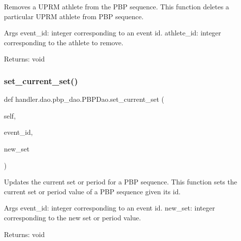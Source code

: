 \begin{DoxyVerb}Removes a UPRM athlete from the PBP sequence.
This function deletes a particular UPRM athlete from PBP sequence.

Args
    event_id: integer corresponding to an event id.
    athlete_id: integer corresponding to the athlete to remove.

Returns:
    void
\end{DoxyVerb}
 \mbox{\label{classhandler_1_1dao_1_1pbp__dao_1_1_p_b_p_dao_a4f1b438b7950a4faa505749891b52be3}} 
\subsubsection{\texorpdfstring{set\+\_\+current\+\_\+set()}{set\_current\_set()}}
{\footnotesize\ttfamily def handler.\+dao.\+pbp\+\_\+dao.\+P\+B\+P\+Dao.\+set\+\_\+current\+\_\+set (\begin{DoxyParamCaption}\item[{}]{self,  }\item[{}]{event\+\_\+id,  }\item[{}]{new\+\_\+set }\end{DoxyParamCaption})}

\begin{DoxyVerb}Updates the current set or period for a PBP sequence.
This function sets the current set or period value of a PBP sequence given its id.

Args
    event_id: integer corresponding to an event id.
    new_set: integer corresponding to the new set or period value.

Returns:
    void
\end{DoxyVerb}
 \mbox{\label{classhandler_1_1dao_1_1pbp__dao_1_1_p_b_p_dao_a8fb43c276529f4747419d30551badba7}} 
